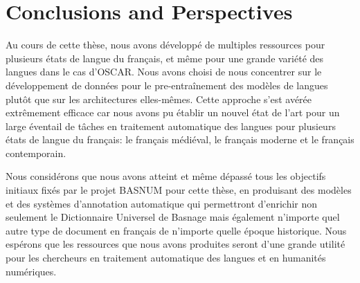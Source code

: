 \chapter{Conclusions and Perspectives}

Au cours de cette thèse, nous avons développé de multiples ressources pour plusieurs états de langue du français, et même pour une grande variété des langues dans le cas d'OSCAR. Nous avons choisi de nous concentrer sur le développement de données pour le pre-entraînement des modèles de langues plutôt que sur les architectures elles-mêmes. Cette approche s'est avérée extrêmement efficace car nous avons pu établir un nouvel état de l'art pour un large éventail de tâches en traitement automatique des langues pour plusieurs états de langue du français: le français médiéval, le français moderne et le français contemporain.

Nous considérons que nous avons atteint et même dépassé tous les objectifs initiaux fixés par le projet BASNUM pour cette thèse, en produisant des modèles et des systèmes d'annotation automatique qui permettront d'enrichir non seulement le Dictionnaire Universel de Basnage mais également n'importe quel autre type de document en français de n'importe quelle époque historique. Nous espérons que les ressources que nous avons produites seront d'une grande utilité pour les chercheurs en traitement automatique des langues et en humanités numériques.